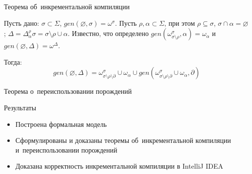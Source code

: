 \begin{frame}{Теорема об~инкрементальной компиляции}

Пусть дано: $\sigma \subset \Sigma$, $gen(\varnothing, \sigma) = \omega^\sigma$. Пусть $\rho, \alpha \subset \Sigma$, при этом $\rho \subseteq \sigma$, $\sigma \cap \alpha = \varnothing$; $\Delta = \Delta^\rho_\alpha\sigma = \sigma\setminus\rho\cup\alpha$. Известно, что определено $gen(\omega^\sigma_{\sigma\setminus\rho}, \alpha) = \omega_\alpha$ и $gen(\varnothing, \Delta) = \omega^\Delta$.

\pause

Тогда:
$$gen(\varnothing, \Delta) = \omega^\sigma_{\sigma\setminus\rho\setminus\partial} \cup \omega_\alpha \cup gen(\omega^\sigma_{\sigma\setminus\rho\setminus\partial} \cup \omega_\alpha, \partial)$$

\end{frame}

\begin{frame}{Теорема о~переиспользовании порождений}
\end{frame}


\begin{frame}{Результаты}
\begin{itemize}
	\item Построена формальная модель
	\item Сформулированы и доказаны теоремы об~инкрементальной компиляции и~переиспользовании порождений
	\item Доказана корректность инкрементальной компиляции в IntelliJ IDEA
\end{itemize}
\end{frame}


